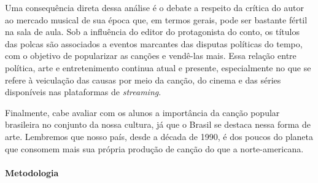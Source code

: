\documentclass[11pt]{extarticle}
\begin{document}
Uma consequência direta dessa análise é o debate a respeito da crítica
do autor ao mercado musical de sua época que, em termos gerais, pode ser
bastante fértil na sala de aula. Sob a influência do editor do
protagonista do conto, os títulos das polcas são associados a eventos
marcantes das disputas políticas do tempo, com o objetivo de popularizar
as canções e vendê-las mais. Essa relação entre política, arte e
entretenimento continua atual e presente, especialmente no que se refere
à veiculação das causas por meio da canção, do cinema e das séries
disponíveis nas plataformas de \emph{streaming}.

Finalmente, cabe avaliar com os alunos a importância da canção popular
brasileira no conjunto da nossa cultura, já que o Brasil se destaca
nessa forma de arte. Lembremos que nosso país, desde a década de 1990, é
dos poucos do planeta que consomem mais sua própria produção de canção
do que a norte-americana.

\paragraph{Metodologia}
\end{document}
